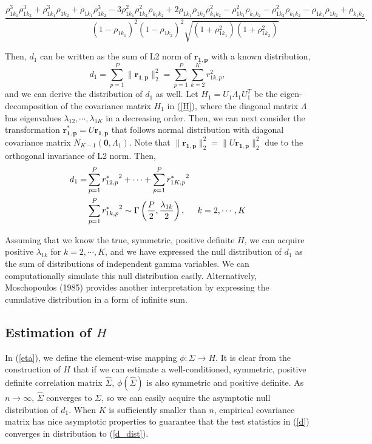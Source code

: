 \documentclass[12pt]{article}
\theoremstyle{theorem}
\begin{document}
\begin{equation} \frac{\rho_{1k_1}^3\rho_{1k_2}^3 + \rho_{1k_1}^3 \rho_{1k_2} + \rho_{1k_1}\rho_{1k_2}^3 - 3\rho_{1k_1}^2\rho_{1k_2}^2\rho_{k_1k_2} + 2\rho_{1k_1}\rho_{1k_2}\rho_{k_1k_2}^2 - \rho_{1k_1}^2\rho_{k_1k_2} - \rho_{1k_2}^2\rho_{k_1k_2} - \rho_{1k_1}\rho_{1k_2} + \rho_{k_1k_2}}{(1-\rho_{1k_1})^2(1-\rho_{1k_2})^2\sqrt{(1+\rho_{1k_1}^2)(1+\rho_{1k_2}^2)}}.
\label{eta}
\end{equation}

\noindent Then, $d_1$ can be written as the sum of L2 norm of $\bm{r_{1,p}}$ with a known distribution, 
\begin{equation}
d_1 = \sum_{p=1}^{P} \|\bm{r_{1,p}}\|_2^2 = \sum_{p=1}^{P} \sum_{k=2}^K r_{1k,p}^2,
\label{d2}
\end{equation}
and we can derive the distribution of $d_1$ as well. Let $H_1 = U_1 \Lambda_1 U_1^T$ be the eigen-decomposition of the covariance matrix $H_1$ in (\ref{H}), where the diagonal matrix $\Lambda$ has eigenvalues $\lambda_{12}, \cdots, \lambda_{1K}$ in a decreasing order. Then, we can next consider the transformation $\bm{r_{1,p}^*} = U\bm{r_{1,p}}$ that follows normal distribution with diagonal covariance matrix $N_{K-1}(\bm{0}, \Lambda_1)$. Note that $\|\bm{r_{1,p}}\|_2^2 = \|U\bm{r_{1,p}}\|_2^2$ due to the orthogonal invariance of L2 norm. Then,
\begin{align}
d_1 = & \sum_{p=1}^{P} {r_{12,p}^*}^2 + \cdots +\sum_{p=1}^P{r_{1K,p}^*}^2\\
&\sum_{p=1}^{P} {r_{1k,p}^*}^2 \sim \Gamma \left( \frac{P}{2}, \frac{\lambda_{1k}}{2} \right), \hspace{5mm} k = 2, \cdots, K
\label{d_dist}
\end{align}

\vspace{5mm} \noindent 
Assuming that we know the true, symmetric, positive definite $H$, we can acquire positive $\lambda_{1k}$ for $k = 2, \cdots, K$, and we have expressed the null distribution of $d_1$ as the sum of distributions of independent gamma variables. We can computationally simulate this null distribution easily. Alternatively, Moschopoulos (1985) \cite{moschopoulos1985distribution} provides another interpretation by expressing the cumulative distribution in a form of infinite sum. 

\subsection{Estimation of $H$}
In (\ref{eta}), we define the element-wise mapping $\phi: \Sigma \rightarrow H$. It is clear from the construction of $H$ that if we can estimate a well-conditioned, symmetric, positive definite correlation matrix $\hat{\Sigma}$, $\phi(\hat{\Sigma})$ is also symmetric and positive definite. As $n \rightarrow \infty$, $\hat{\Sigma}$ converges to $\Sigma$, so we can easily acquire the asymptotic null distribution of $d_1$. When $K$ is sufficiently smaller than $n$, empirical covariance matrix has nice asymptotic properties to guarantee that the test statistics in (\ref{d}) converges in distribution to (\ref{d_dist}).\\
\end{document}
